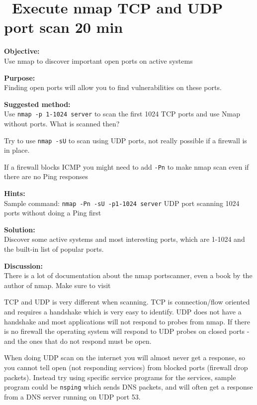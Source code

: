 \documentclass[a4paper,11pt,notitlepage]{report}
\begin{document}
\chapter{\faExclamationTriangle\ Execute nmap TCP and UDP port scan 20 min}
\label{ex:nmap-synscan}


{\bf Objective:} \\
Use nmap to discover important open ports on active systems

{\bf Purpose:}\\
Finding open ports will allow you to find vulnerabilities on these ports.

{\bf Suggested method:}\\
Use \verb+nmap -p 1-1024 server+ to scan the first 1024 TCP
ports and use Nmap without ports. What is scanned then?

Try to use \verb+nmap -sU+ to scan using UDP ports, not really possible if a firewall is in place.

If a firewall blocks ICMP you might need to add \verb+-Pn+ to make nmap scan even if there are no Ping responses

{\bf Hints:} \\
Sample command: \verb+nmap -Pn -sU -p1-1024 server+ UDP port scanning
1024 ports without doing a Ping first

{\bf Solution:}\\
Discover some active systems and most interesting ports, which are 1-1024 and the built-in list of popular ports.

{\bf Discussion:}\\
There is a lot of documentation about the nmap portscanner, even a book by the author
of nmap. Make sure to visit 

TCP and UDP is very different when scanning. TCP is connection/flow oriented and requires a handshake which is very easy to identify. UDP does not have a handshake and most applications will not respond to probes from nmap. If there is no firewall the operating system will respond to UDP probes on closed ports - and the ones that do not respond must be open.

When doing UDP scan on the internet you will almost never get a response, so you cannot tell open (not responding services) from blocked ports (firewall drop packets). Instead try using specific service programs for the services, sample program could be \verb+nsping+ which sends DNS packets, and will often get a response from a DNS server running on UDP port 53.
\end{document}
